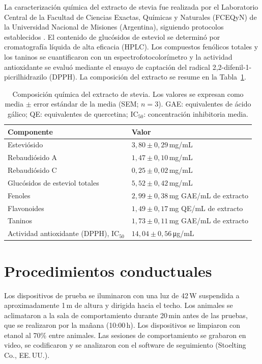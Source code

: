 La caracterización química del extracto de stevia fue realizada por el Laboratorio Central de la Facultad de Ciencias Exactas, Químicas y Naturales (FCEQyN) de la Universidad Nacional de Misiones (Argentina), siguiendo protocolos establecidos \cite{yildizozturk2015extraction,celaya2022infusions}. El contenido de glucósidos de esteviol se determinó por cromatografía líquida de alta eficacia (HPLC). Los compuestos fenólicos totales y los taninos se cuantificaron con un espectrofotocolorímetro y la actividad antioxidante se evaluó mediante el ensayo de captación del radical 2,2-difenil-1-picrilhidrazilo (DPPH). La composición del extracto se resume en la Tabla~\ref{tab:extracto}.

\begin{table}[htbp]
\centering
\caption[Composición química del extracto de stevia]{Composición química del extracto de stevia. Los valores se expresan como media $\pm$ error estándar de la media (SEM; $n = 3$). GAE: equivalentes de ácido gálico; QE: equivalentes de quercetina; IC$_{50}$: concentración inhibitoria media.}
\label{tab:extracto}
\small
\begin{tabular}{@{}l l@{}}
\toprule
\textbf{Componente} & \textbf{Valor} \\
\midrule
Esteviósido & $3{,}80 \pm 0{,}29$\,mg/mL \\
Rebaudiósido A & $1{,}47 \pm 0{,}10$\,mg/mL \\
Rebaudiósido C & $0{,}25 \pm 0{,}02$\,mg/mL \\
Glucósidos de esteviol totales & $5{,}52 \pm 0{,}42$\,mg/mL \\
Fenoles & $2{,}99 \pm 0{,}38$\,mg GAE/mL de extracto \\
Flavonoides & $1{,}49 \pm 0{,}17$\,mg QE/mL de extracto \\
Taninos & $1{,}73 \pm 0{,}11$\,mg GAE/mL de extracto \\
Actividad antioxidante (DPPH), IC$_{50}$ & $14{,}04 \pm 0{,}56$\,\si{\micro\gram}/mL \\
\bottomrule
\end{tabular}
\end{table}

\FloatBarrier
\section{Procedimientos conductuales}\label{sec:conductual}

Los dispositivos de prueba se iluminaron con una luz de 42\,W suspendida a aproximadamente 1\,m de altura y dirigida hacia el techo. Los animales se aclimataron a la sala de comportamiento durante 20\,min antes de las pruebas, que se realizaron por la mañana (10:00\,h). Los dispositivos se limpiaron con etanol al 70\% entre animales. Las sesiones de comportamiento se grabaron en video, se codificaron y se analizaron con el software de seguimiento \anymaze{} (Stoelting Co., EE.\,UU.).

